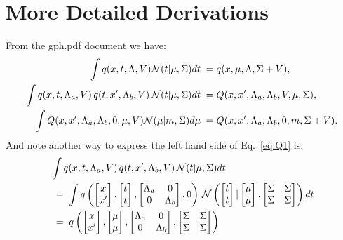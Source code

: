 \documentclass[a4paper,10pt]{article}
\newcommand{\N}{\mathcal{N}}
\newcommand{\inv}{^{-1}}
\newcommand{\E}{\mathbb{E}}
\newcommand{\nnn}{\nonumber \\}
\begin{document}
\section{More Detailed Derivations}
From the gph.pdf document we have:
\begin{eqnarray}
\int q(x,t,\Lambda,V){\cal N}(t|\mu,\Sigma)dt\;=&\;q(x,\mu,\Lambda,\Sigma+V),\\
\int q(x,t,\Lambda_a,V)\,q(t,x',\Lambda_b,V)\,{\cal
  N}(t|\mu,\Sigma)dt\;=&\;Q(x,x',\Lambda_a,\Lambda_b,V,\mu,\Sigma),\label{eq:Q1}\\
\int Q(x,x',\Lambda_a,\Lambda_b,0,\mu,V){\cal N}(\mu|m,\Sigma)d\mu\;=&\;Q(x,x',\Lambda_a,\Lambda_b,0,m,\Sigma+V).
\end{eqnarray}
And note another way to express the left hand side of Eq.~\ref{eq:Q1} is:
\begin{eqnarray}
&\int q(x,t,\Lambda_a,V)\,q(t,x',\Lambda_b,V)\,\N(t|\mu,\Sigma)dt \nnn
 &\;=\; \int q\left(\xx,\ttt,\LambdaLambda,0\right)\,\N\left(\ttt|\mumu,\SigmaSigma\right)dt \nnn
 &\;=\; q\left(\xx,\mumu,\LambdaLambda,\SigmaSigma\right) \label{eq:qtrick}
\end{eqnarray}

\end{document}
